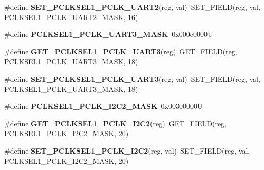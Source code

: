\begin{DoxyCompactItemize}
\item 
\mbox{\label{group__lpc24xx__regs_ga06a6b398188d9b0a782420c7b1d4e5ac}} 
\#define {\bfseries S\+E\+T\+\_\+\+P\+C\+L\+K\+S\+E\+L1\+\_\+\+P\+C\+L\+K\+\_\+\+U\+A\+R\+T2}(reg,  val)~S\+E\+T\+\_\+\+F\+I\+E\+LD(reg, val, P\+C\+L\+K\+S\+E\+L1\+\_\+\+P\+C\+L\+K\+\_\+\+U\+A\+R\+T2\+\_\+\+M\+A\+SK, 16)
\item 
\mbox{\label{group__lpc24xx__regs_gae6741ed566ebf6bfc92f9e147b826001}} 
\#define {\bfseries P\+C\+L\+K\+S\+E\+L1\+\_\+\+P\+C\+L\+K\+\_\+\+U\+A\+R\+T3\+\_\+\+M\+A\+SK}~0x000c0000U
\item 
\mbox{\label{group__lpc24xx__regs_ga7fc41f97eae8e361fe3fb6e63373d408}} 
\#define {\bfseries G\+E\+T\+\_\+\+P\+C\+L\+K\+S\+E\+L1\+\_\+\+P\+C\+L\+K\+\_\+\+U\+A\+R\+T3}(reg)~G\+E\+T\+\_\+\+F\+I\+E\+LD(reg, P\+C\+L\+K\+S\+E\+L1\+\_\+\+P\+C\+L\+K\+\_\+\+U\+A\+R\+T3\+\_\+\+M\+A\+SK, 18)
\item 
\mbox{\label{group__lpc24xx__regs_ga26c06b5908055e4d06c433b68725bdbf}} 
\#define {\bfseries S\+E\+T\+\_\+\+P\+C\+L\+K\+S\+E\+L1\+\_\+\+P\+C\+L\+K\+\_\+\+U\+A\+R\+T3}(reg,  val)~S\+E\+T\+\_\+\+F\+I\+E\+LD(reg, val, P\+C\+L\+K\+S\+E\+L1\+\_\+\+P\+C\+L\+K\+\_\+\+U\+A\+R\+T3\+\_\+\+M\+A\+SK, 18)
\item 
\mbox{\label{group__lpc24xx__regs_gae32530889f091315a355b6c4195eb3f7}} 
\#define {\bfseries P\+C\+L\+K\+S\+E\+L1\+\_\+\+P\+C\+L\+K\+\_\+\+I2\+C2\+\_\+\+M\+A\+SK}~0x00300000U
\item 
\mbox{\label{group__lpc24xx__regs_ga0b6e8c98525317acef133e4173c54f82}} 
\#define {\bfseries G\+E\+T\+\_\+\+P\+C\+L\+K\+S\+E\+L1\+\_\+\+P\+C\+L\+K\+\_\+\+I2\+C2}(reg)~G\+E\+T\+\_\+\+F\+I\+E\+LD(reg, P\+C\+L\+K\+S\+E\+L1\+\_\+\+P\+C\+L\+K\+\_\+\+I2\+C2\+\_\+\+M\+A\+SK, 20)
\item 
\mbox{\label{group__lpc24xx__regs_ga2d67fc6de7aa86353cb5362538e8f6ce}} 
\#define {\bfseries S\+E\+T\+\_\+\+P\+C\+L\+K\+S\+E\+L1\+\_\+\+P\+C\+L\+K\+\_\+\+I2\+C2}(reg,  val)~S\+E\+T\+\_\+\+F\+I\+E\+LD(reg, val, P\+C\+L\+K\+S\+E\+L1\+\_\+\+P\+C\+L\+K\+\_\+\+I2\+C2\+\_\+\+M\+A\+SK, 20)
\item 

\end{DoxyCompactItemize}
